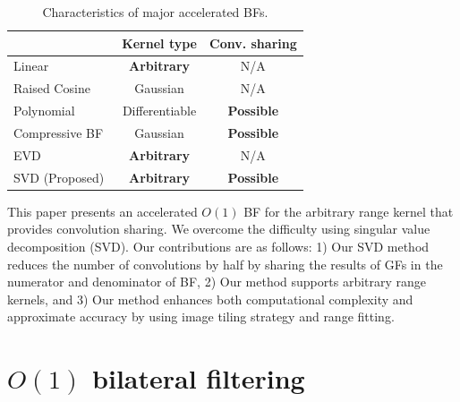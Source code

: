\documentclass{article}
\begin{document}
\begin{table}[tb]
\centering
\caption{Characteristics of major accelerated BFs.}
\vspace{-3mm}
\label{t:review}
\small{
\begin{tabular}{l|c|c}
               & Kernel type        & Conv. sharing     \\ \hline\hline
Linear~\cite{yang2009realtime}         & \textbf{Arbitrary} & N/A               \\ \hline
Raised Cosine~\cite{chaudhury2011constant,chaudhury2011fast,chaudhury2013acceleration}   & Gaussian            & N/A               \\ \hline
Polynomial~\cite{chaudhury2015fast,chaudhury2016fast}         & Differentiable     & \textbf{Possible} \\ \hline
Compressive BF~\cite{sugimoto2015compressive,deng2017fast}    & Gaussian            & \textbf{Possible} \\ \hline
EVD~\cite{sugimoto2016consant,papari2017fast}            & \textbf{Arbitrary} & N/A               \\ \hline
SVD (Proposed) & \textbf{Arbitrary} & \textbf{Possible}
\end{tabular}
}
\vspace{-5mm}
\end{table}

This paper presents an accelerated $O(1)$ BF for the arbitrary range kernel that provides convolution sharing.
We overcome the difficulty using singular value decomposition (SVD).
Our contributions are as follows:
1) Our SVD method reduces the number of convolutions by half by sharing the results of GFs in the numerator and denominator of BF,
2) Our method supports arbitrary range kernels,
and 3) Our method enhances both computational complexity and approximate accuracy by using image tiling strategy and range fitting.


\section{$O(1)$ bilateral filtering}
\end{document}
